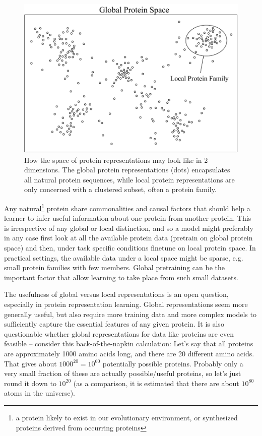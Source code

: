 \begin{figure}[ht]
    \centering
    \includegraphics{report/figures/protein_global_local.pdf}
    \caption{How the space of protein representations may look like in 2 dimensions. The global protein representations (dots) encapsulates all natural protein sequences, while local protein representations are only concerned with a clustered subset, often a protein family.}
    \label{fig:global_local}
\end{figure}

Any natural\footnote{a protein likely to exist in our evolutionary environment, or synthesized proteins derived from occurring proteins} protein share commonalities and causal factors that should help a learner to infer useful information about one protein from another protein. This is irrespective of any global or local distinction, and so a model might preferably in any case first look at all the available protein data (pretrain on global protein space) and then, under task specific conditions finetune on local protein space. In practical settings, the available data under a local space might be sparse, e.g. small protein families with few members. Global pretraining can be the important factor that allow learning to take place from such small datasets.

The usefulness of global versus local representations is an open question, especially in protein representation learning. Global representations seem more generally useful, but also require more training data and more complex models to sufficiently capture the essential features of any given protein. It is also questionable whether global representations for data like proteins are even feasible -- consider this back-of-the-napkin calculation: Let's say that all proteins are approximately 1000 amino acids long, and there are 20 different amino acids. That gives about $1000^{20} = 10^{60}$ potentially possible proteins. Probably only a very small fraction of these are actually possible/useful proteins, so let's just round it down to $10^{20}$ (as a comparison, it is estimated that there are about $10^{80}$ atoms in the universe).

